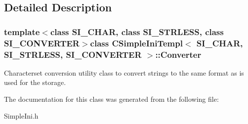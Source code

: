 \subsection{Detailed Description}
\subsubsection*{template$<$class S\+I\+\_\+\+C\+H\+A\+R, class S\+I\+\_\+\+S\+T\+R\+L\+E\+S\+S, class S\+I\+\_\+\+C\+O\+N\+V\+E\+R\+T\+E\+R$>$class C\+Simple\+Ini\+Templ$<$ S\+I\+\_\+\+C\+H\+A\+R, S\+I\+\_\+\+S\+T\+R\+L\+E\+S\+S, S\+I\+\_\+\+C\+O\+N\+V\+E\+R\+T\+E\+R $>$\+::\+Converter}

Characterset conversion utility class to convert strings to the same format as is used for the storage. 

The documentation for this class was generated from the following file\+:\begin{DoxyCompactItemize}
\item 
Simple\+Ini.\+h\end{DoxyCompactItemize}
